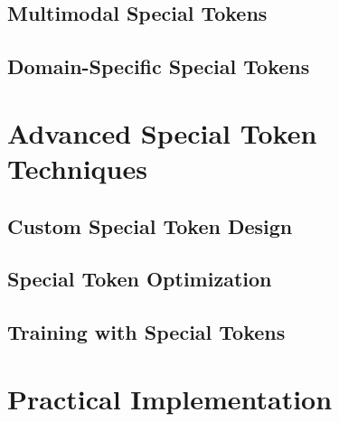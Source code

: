 \documentclass[11pt,oneside]{book}
\theoremstyle{definition}
\theoremstyle{plain}
\theoremstyle{remark}
\begin{document}
\chapter{Multimodal Special Tokens}







\chapter{Domain-Specific Special Tokens}





\part{Advanced Special Token Techniques}

\chapter{Custom Special Token Design}





\chapter{Special Token Optimization}





\chapter{Training with Special Tokens}





\part{Practical Implementation}
\end{document}
